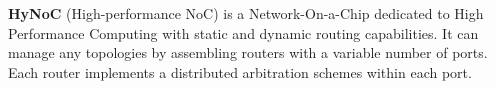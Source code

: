\textbf{HyNoC} (High-performance NoC) is a Network-On-a-Chip dedicated to High Performance Computing with static and dynamic
routing capabilities. It can manage any topologies by assembling routers with a variable number of ports. Each router
implements a distributed arbitration schemes within each port.
